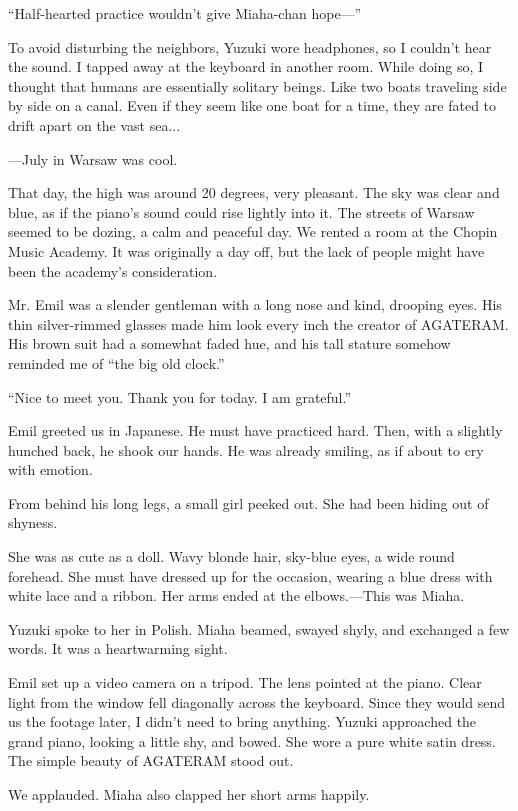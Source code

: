 \documentclass[
    a4paper,
    12pt,
    twoside,
    openany,
    UTF8,
    fontset=windows
]{ctexbook}
\begin{document}
``Half-hearted practice wouldn't give Miaha-chan hope---''

To avoid disturbing the neighbors, Yuzuki wore headphones, so I couldn't hear the sound. I tapped away at the keyboard in another room. While doing so, I thought that humans are essentially solitary beings. Like two boats traveling side by side on a canal. Even if they seem like one boat for a time, they are fated to drift apart on the vast sea...

---July in Warsaw was cool.

That day, the high was around 20 degrees, very pleasant. The sky was clear and blue, as if the piano's sound could rise lightly into it. The streets of Warsaw seemed to be dozing, a calm and peaceful day. We rented a room at the Chopin Music Academy. It was originally a day off, but the lack of people might have been the academy's consideration.

Mr. Emil was a slender gentleman with a long nose and kind, drooping eyes. His thin silver-rimmed glasses made him look every inch the creator of AGATERAM. His brown suit had a somewhat faded hue, and his tall stature somehow reminded me of ``the big old clock.''

``Nice to meet you. Thank you for today. I am grateful.''

Emil greeted us in Japanese. He must have practiced hard. Then, with a slightly hunched back, he shook our hands. He was already smiling, as if about to cry with emotion.

From behind his long legs, a small girl peeked out. She had been hiding out of shyness.

She was as cute as a doll. Wavy blonde hair, sky-blue eyes, a wide round forehead. She must have dressed up for the occasion, wearing a blue dress with white lace and a ribbon. Her arms ended at the elbows.---This was Miaha.

Yuzuki spoke to her in Polish. Miaha beamed, swayed shyly, and exchanged a few words. It was a heartwarming sight.

Emil set up a video camera on a tripod. The lens pointed at the piano. Clear light from the window fell diagonally across the keyboard. Since they would send us the footage later, I didn't need to bring anything. Yuzuki approached the grand piano, looking a little shy, and bowed. She wore a pure white satin dress. The simple beauty of AGATERAM stood out.

We applauded. Miaha also clapped her short arms happily.
\end{document}
